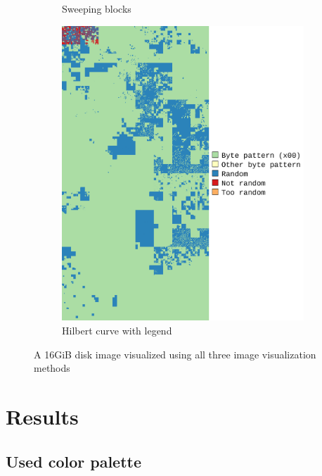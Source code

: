 \documentclass[
  digital, %
  oneside, %
  lof,     %
  lot,     %
]{fithesis4}
\begin{document}
\begin{figure}
\begin{subfigure}[t]{.45\textwidth}
        \caption{Sweeping blocks}
        \label{fig:impl-sweeping-blocks}
    \end{subfigure}
    \begin{subfigure}[t]{.5\textwidth}
        \centering
        \includegraphics[width=\textwidth,interpolate=false]{figures/pv204_fde-chi2-4-hilbert.png}
        \caption{Hilbert curve with legend}
        \label{fig:impl-hilbert-curve}
    \end{subfigure}
    \caption{A 16GiB disk image visualized using all three image visualization methods}
    \label{fig:impl-visualizations}
\end{figure}

\chapter{Results}

\section{Used color palette}
\end{document}
